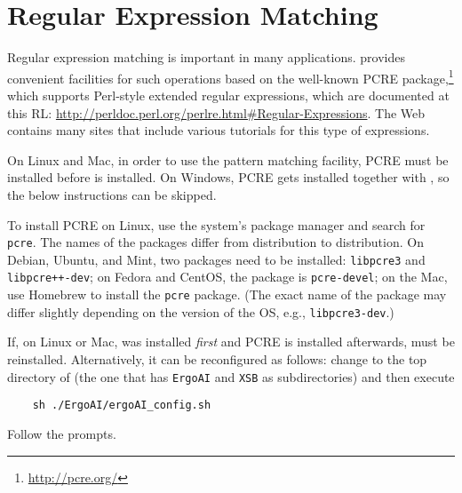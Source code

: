 
\section{Regular Expression Matching}
\label{sec-regexp}

Regular expression matching is important in many applications. \ERGO
provides convenient facilities for such operations based on the well-known
PCRE package,\footnote{
  \url{http://pcre.org/}
  }
which supports Perl-style extended regular expressions, which are
documented at this RL:
\url{http://perldoc.perl.org/perlre.html#Regular-Expressions}. The Web
contains many sites that include various tutorials for this type of
expressions.

On Linux and Mac,
in order to use the pattern matching facility, PCRE must be installed
before \ERGO is installed. On Windows, PCRE gets installed together with \ERGO,
so the below instructions can be skipped.

To install PCRE on Linux, use the system's package manager and search for
\texttt{pcre}. The names of the packages differ from distribution to
distribution. On Debian, Ubuntu, and Mint, two packages need to be installed:
\texttt{libpcre3} and \texttt{libpcre++-dev}; on Fedora and CentOS, the package is
\texttt{pcre-devel}; on the Mac, use Homebrew to install the \texttt{pcre}
package. (The exact name of the package may differ slightly depending on the
version of the OS, e.g., \texttt{libpcre3-dev}.)

If, on Linux or Mac, \ERGO was installed \emph{first} and PCRE is
installed afterwards, \ERGOAI must be reinstalled.
Alternatively, it can be reconfigured as follows: change to the
top directory of \ERGOAI (the one that has \texttt{ErgoAI} and
\texttt{XSB} as subdirectories) and then execute
\begin{verbatim}
    sh ./ErgoAI/ergoAI_config.sh
\end{verbatim}
Follow the prompts.

